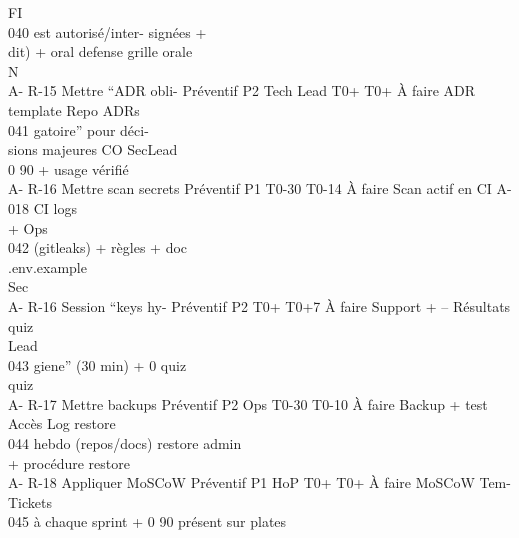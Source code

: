 \vspace{0.5em}
FI\\
040         est autorisé/inter-                                                    signées +\\
dit) + oral defense                                                    grille orale\\
\vspace{0.5em}
\vspace{0.5em}
\vspace{0.5em}
\vspace{0.5em}
N\\
A- R-15     Mettre “ADR obli- Préventif P2      Tech Lead    T0+ T0+ À faire       ADR template Repo          ADRs\\
041         gatoire” pour déci-\\
sions majeures             CO       SecLead\\
0     90              + usage vérifié\\
\vspace{0.5em}
\vspace{0.5em}
A- R-16     Mettre scan secrets Préventif P1                 T0-30 T0-14 À faire   Scan actif en CI A-018     CI logs\\
+ Ops\\
042         (gitleaks) + règles                                                    + doc\\
.env.example\\
Sec\\
A- R-16     Session “keys hy-    Préventif P2                T0+ T0+7 À faire      Support +       –          Résultats quiz\\
Lead\\
043         giene” (30 min) +                                0                     quiz\\
quiz\\
A- R-17     Mettre backups       Préventif P2   Ops          T0-30 T0-10 À faire   Backup + test Accès        Log restore\\
044         hebdo (repos/docs)                                                     restore       admin\\
+ procédure restore\\
A- R-18     Appliquer MoSCoW Préventif P1       HoP          T0+ T0+ À faire       MoSCoW          Tem-       Tickets\\
045         à chaque sprint +                                0     90              présent sur     plates\\
